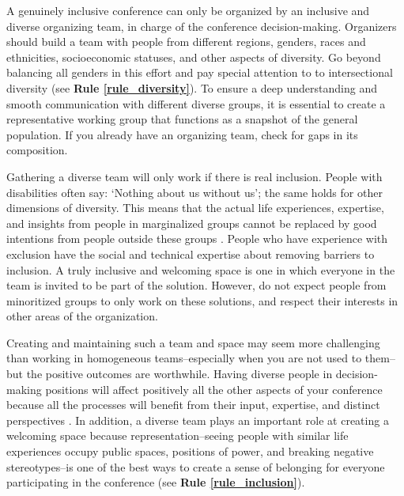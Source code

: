 \documentclass[10pt,letterpaper]{article}
\begin{document}
A genuinely inclusive conference can only be organized by an inclusive and diverse organizing team, in charge of the conference decision-making.
Organizers should build a team with people from different regions, genders, races and ethnicities, socioeconomic statuses, and other aspects of diversity. 
Go beyond balancing all genders in this effort and pay special attention to to intersectional diversity (see \textbf{Rule \ref{rule_diversity}}). 
To ensure a deep understanding and smooth communication with different diverse groups, it is essential to create a representative working group that functions as a snapshot of the general population.
If you already have an organizing team, check for gaps in its composition. 

Gathering a diverse team will only work if there is real inclusion. 
People with disabilities often say: `Nothing about us without us'; the same holds for other dimensions of diversity. 
This means that the actual life experiences, expertise, and insights from people in marginalized groups cannot be replaced by good intentions from people outside these groups \cite{costanzachockDesign2020}.
People who have experience with exclusion have the social and technical expertise about removing barriers to inclusion.
A truly inclusive and welcoming space is one in which everyone in the team is invited to be part of the solution.
However, do not expect people from minoritized groups to only work on these solutions, and respect their interests in other areas of the organization. 

Creating and maintaining such a team and space may seem more challenging than working in homogeneous teams--especially when you are not used to them--but the positive outcomes are worthwhile. 
Having diverse people in decision-making positions will affect positively all the other aspects of your conference because all the processes will benefit from their input, expertise, and distinct perspectives \cite{hongGroupsDiverseProblem2004}. 
In addition, a diverse team plays an important role at creating a welcoming space because representation--seeing people with similar life experiences occupy public spaces, positions of power, and breaking negative stereotypes--is one of the best ways to create a sense of belonging for everyone participating in the conference (see \textbf{Rule \ref{rule_inclusion}}). 
\end{document}
